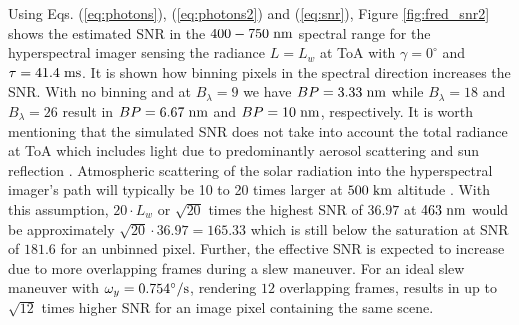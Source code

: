 Using Eqs. (\ref{eq:photons}), (\ref{eq:photons2}) and (\ref{eq:snr}), Figure \ref{fig:fred_snr2} shows the estimated SNR in the $400-750\hspace{3pt} \rm{nm}$ spectral range for the hyperspectral imager sensing the radiance $L=L_w$ at ToA with $\gamma=0^{\circ}$ and $\tau=41.4 \hspace{3pt} \rm{ms}$. It is shown how binning  pixels in the spectral direction increases the SNR. With no binning and at $B_\lambda=9$ we have $BP=3.33 \hspace{3pt} \rm{nm}$ while $B_\lambda=18$ and $B_\lambda=26$ result in $BP=6.67 \hspace{3pt} \rm{nm}$ and $BP=10 \hspace{3pt} \rm{nm}$, respectively. 
It is worth mentioning that the simulated SNR does not take into account the total radiance at ToA which includes light due to predominantly aerosol scattering and sun reflection \cite{Franz2007}. Atmospheric scattering of the solar radiation into the hyperspectral imager's path will typically be 10 to 20 times larger at $500 \hspace{3pt} \rm{km}$ altitude \cite{Corson2008, Gao2012}. With this assumption, $20\cdot L_w$ or $\sqrt{20}$ times the highest SNR of $36.97$ at $463 \hspace{3pt} \rm{nm}$ would be approximately $\sqrt{20}\cdot36.97=165.33$ which is still below the saturation at SNR of $181.6$ for an unbinned pixel. Further, the effective SNR is expected to increase due to more overlapping frames during a slew maneuver. For an ideal slew maneuver with $\omega_y=0.754^{\circ}\rm{/s}$, rendering $12$ overlapping frames, results in up to $\sqrt{12}$ times higher SNR for an image pixel containing the same scene.

